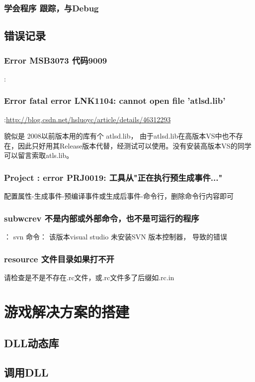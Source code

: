 \documentclass[UTF8,a4paper,8pt]{ctexbook}
\begin{document}
	
		\subsection{学会程序 跟踪，与Debug}
	\section{错误记录}
		\subsection{Error MSB3073 代码9009}:
		
		\subsection{Error fatal error LNK1104: cannot open file 'atlsd.lib'}:\url{http://blog.csdn.net/hsluoyc/article/details/46312293}
		
		貌似是 2008以前版本用的库有个 atlsd.lib， 由于atlsd.lib在高版本VS中也不存在，因此只好用其Release版本代替，经测试可以使用。没有安装高版本VS的同学可以留言索取atls.lib。
		
		
		\subsection{Project : error PRJ0019: 工具从"正在执行预生成事件..."}
			配置属性-生成事件-预编译事件或生成后事件-命令行，删除命令行内容即可
			
			
		\subsection{subwcrev 不是内部或外部命令，也不是可运行的程序}：
			svn 命令： 该版本visual studio  未安装SVN 版本控制器， 导致的错误
			
		\subsection{resource 文件目录如果打不开}请检查是不是不存在.rc文件，或.rc文件多了后缀如.rc.in
				
\chapter{游戏解决方案的搭建}
	\section{DLL动态库}
	
	\section{调用DLL}
	
\end{document}
